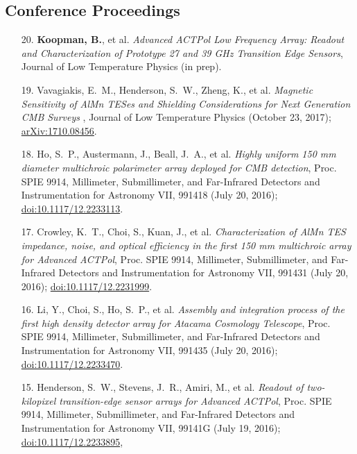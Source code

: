 \documentclass[margin,line]{res}
\begin{document}
\begin{resume}
\section{\sc Conference Proceedings} 
\begin{enumerate}

\item[{20.}] \textbf{Koopman, B.}, et al.
    \textit{Advanced ACTPol Low Frequency Array: Readout and Characterization
    of Prototype 27 and 39 GHz Transition Edge Sensors}, Journal of Low Temperature
    Physics (in prep).
\item[{19.}] Vavagiakis, E.~M., Henderson, S.~W., Zheng, K., et al.
    \textit{Magnetic Sensitivity of AlMn TESes and Shielding Considerations for
Next Generation CMB Surveys }, Journal of Low Temperature
    Physics (October 23, 2017);
    \href{https://arxiv.org/abs/1710.08456}{arXiv:1710.08456}.
\item[{18.}] Ho, S.~P., Austermann, J., Beall, J.~A., et al.
    \textit{Highly uniform 150 mm diameter multichroic polarimeter array
    deployed for CMB detection}, Proc. SPIE 9914,
    Millimeter, Submillimeter, and Far-Infrared Detectors and Instrumentation for
    Astronomy VII, 991418 (July 20, 2016);
    \href{http://dx.doi.org/10.1117/12.2233113}{doi:10.1117/12.2233113}.
\item[{17.}] Crowley, K.~T., Choi, S., Kuan, J., et al.
    \textit{Characterization of AlMn TES impedance, noise, and optical efficiency
    in the first 150 mm multichroic array for Advanced ACTPol}, Proc. SPIE 9914,
    Millimeter, Submillimeter, and Far-Infrared Detectors and Instrumentation for
    Astronomy VII, 991431 (July 20, 2016);
    \href{http://dx.doi.org/10.1117/12.2231999}{doi:10.1117/12.2231999}.
\item[{16.}] Li, Y., Choi, S., Ho, S.~P., et al. \textit{Assembly and
    integration process of the first high density detector array for Atacama
    Cosmology Telescope}, Proc. SPIE 9914, Millimeter, Submillimeter, and
    Far-Infrared Detectors and Instrumentation for Astronomy VII, 991435 (July 20,
    2016); \href{http://dx.doi.org/10.1117/12.2233470}{doi:10.1117/12.2233470}.
\item[{15.}] Henderson, S.~W., Stevens, J.~R., Amiri, M., et al.
    \textit{Readout of two-kilopixel transition-edge sensor arrays for Advanced
    ACTPol}, Proc. SPIE 9914, Millimeter, Submillimeter, and Far-Infrared Detectors
    and Instrumentation for Astronomy VII, 99141G (July 19, 2016);
    \href{http://dx.doi.org/10.1117/12.2233895}{doi:10.1117/12.2233895},

\end{enumerate}
\end{resume}
\end{document}
